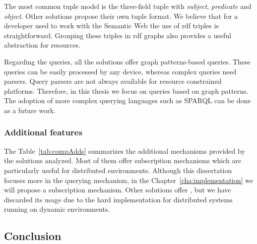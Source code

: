 The most common tuple model is the three-field tuple with \emph{subject}, \emph{predicate} and \emph{object}.
Other solutions propose their own tuple format.
We believe that for a developer used to work with the Semantic Web the use of \ac{rdf} triples is straightforward.
Grouping these triples in \ac{rdf} graphs also provides a useful abstraction for resources.

Regarding the queries, all the solutions offer graph patterns-based queries.
These queries can be easily processed by any device, whereas complex queries need parsers.
Query parsers are not always available for resource constrained platforms.
Therefore, in this thesis we focus on queries based on graph patterns.
The adoption of more complex querying languages such as SPARQL can be done as a future work. %






\subsubsection{Additional features}

The Table~\ref{tab:compAdds} summarizes the additional mechanisms provided by the solutions analyzed.
Most of them offer subscription mechanisms which are particularly useful for distributed environments.
Although this dissertation focuses more in the querying mechanism, in the Chapter~\ref{cha:implementation} we will propose a subscription mechanism.
Other solutions offer , but we have discarded its usage due to the hard implementation for distributed systems running on dynamic environments.










\subsection{Conclusion}

